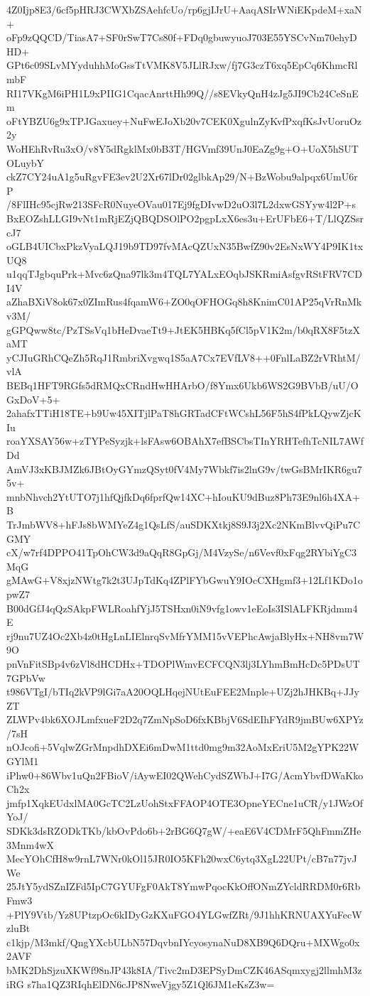 4Z0Ijp8E3/6cf5pHRJ3CWXbZSAehfcUo/rp6gjIJrU+AaqASIrWNiEKpdeM+xaN+
oFp9zQQCD/TiasA7+SF0rSwT7Cs80f+FDq0gbuwyuoJ703E55YSCvNm70ehyDHD+
GPt6c09SLvMYyduhhMoGssTtVMK8V5JLlRJxw/fj7G3czT6xq5EpCq6KhmcRlmbF
RI17VKgM6iPH1L9xPIIG1CqacAnrttHh99Q//s8EVkyQnH4zJg5JI9Cb24CeSnEm
oFtYBZU6g9xTPJGaxuey+NuFwEJoXb20v7CEK0XgulnZyKvfPxqfKsJvUoruOz2y
WoHEhRvRu3xO/v8Y5dRgklMx0bB3T/HGVmf39UnJ0EaZg9g+O+UoX5hSUTOLuybY
ckZ7CY24uA1g5uRgvFE3ev2U2Xr67lDr02glbkAp29/N+BzWobu9alpqx6UmU6rP
/8FlIHc95cjRw213SFcR0NuyeOVau017Ej9fgDIvwD2uO3l7L2dxwGSYyw4l2P+s
BxEOZshLLGI9vNt1mRjEZjQBQDSOlPO2pgpLxX6es3u+ErUFbE6+T/LlQZSsrcJ7
oGLB4UICbxPkzVyaLQJ19b9TD97fvMAcQZUxN35BwfZ90v2EsNxWY4P9IK1txUQ8
u1qqTJgbquPrk+Mvc6zQna97lk3m4TQL7YALxEOqbJSKRmiAsfgvRStFRV7CDI4V
aZhaBXiV8ok67x0ZImRus4fqamW6+ZO0qOFHOGq8h8KnimC01AP25qVrRnMkv3M/
gGPQww8tc/PzTSsVq1bHeDvaeTt9+JtEK5HBKq5fCl5pV1K2m/b0qRX8F5tzXaMT
yCJIuGRhCQeZh5RqJ1RmbriXvgwq1S5aA7Cx7EVfLV8++0FnlLaBZ2rVRhtM/vlA
BEBq1HFT9RGfs5dRMQxCRndHwHHArbO/f8Ymx6Ukb6WS2G9BVbB/uU/OGxDoV+5+
2ahafxTTiH18TE+b9Uw45XITjlPaT8hGRTadCFtWCshL56F5hS4fPkLQywZjcKIu
roaYXSAY56w+zTYPeSyzjk+lsFAsw6OBAhX7efBSCbsTInYRHTefhTcNIL7AWfDd
AmVJ3xKBJMZk6JBtOyGYmzQSyt0fV4My7Wbkf7is2lnG9v/twGsBMrIKR6gu75v+
mnbNhvch2YtUTO7j1hfQjfkDq6fprfQw14XC+hIouKU9dBuz8Ph73E9nl6h4XA+B
TrJmbWV8+hFJs8bWMYeZ4g1QsLfS/auSDKXtkj8S9J3j2Xc2NKmBlvvQiPu7CGMY
cX/w7rf4DPPO41TpOhCW3d9aQqR8GpGj/M4VzySe/n6Vevf0xFqg2RYbiYgC3MqG
gMAwG+V8xjzNWtg7k2t3UJpTdKq4ZPlFYbGwuY9IOcCXHgmf3+12Lf1KDo1opwZ7
B00dGfJ4qQzSAkpFWLRoahfYjJ5TSHxn0iN9vfg1owv1eEoIs3ISlALFKRjdmm4E
rj9nu7UZ4Oc2Xb4z0tHgLnLIElnrqSvMfrYMM15vVEPhcAwjaBlyHx+NH8vm7W9O
pnVnFitSBp4v6zVl8dHCDHx+TDOPlWmvECFCQN3lj3LYhmBmHcDc5PDsUT7GPbVw
t986VTgI/bTIq2kVP9lGi7aA20OQLHqejNUtEuFEE2Mnple+UZj2hJHKBq+JJyZT
ZLWPv4bk6XOJLmfxueF2D2q7ZmNpSoD6fxKBbjV6SdEIhFYdR9jmBUw6XPYz/7sH
nOJcofi+5VqlwZGrMnpdhDXEi6mDwM1ttd0mg9m32AoMxEriU5M2gYPK22WGYlM1
iPhw0+86Wbv1uQn2FBioV/iAywEI02QWehCydSZWbJ+I7G/AcmYbvfDWaKkoCh2x
jmfp1XqkEUdxlMA0GcTC2LzUohStxFFAOP4OTE3OpneYECne1uCR/y1JWzOfYoJ/
SDKk3dsRZODkTKb/kbOvPdo6b+2rBG6Q7gW/+eaE6V4CDMrF5QhFmmZHe3Mnm4wX
MecYOhCfH8w9rnL7WNr0kOl15JR0IO5KFh20wxC6ytq3XgL22UPt/cB7n77jvJWe
25JtY5ydSZnIZFd5IpC7GYUFgF0AkT8YmwPqocKkOffONmZYcldRRDM0r6RbFmw3
+PlY9Vtb/Yz8UPtzpOc6kIDyGzKXuFGO4YLGwfZRt/9J1hhKRNUAXYuFecWzluBt
c1kjp/M3mkf/QngYXcbULbN57DqvbnIYcyosynaNuD8XB9Q6DQru+MXWgo0x2AVF
bMK2DhSjzuXKWf98nJP43k8IA/Tivc2mD3EPSyDmCZK46ASqmxygj2llmhM3ziRG
s7ha1QZ3RIqhElDN6cJP8NweVjgy5Z1Ql6JM1eKsZ3w=
